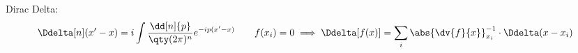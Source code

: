 Dirac Delta:
\begin{equation*}
        \Ddelta[n](x'-x) = i\int\frac{\dd[n]{p}}{\qty(2\pi)^n}e^{-ip(x'-x)}
        \qquad
        f(x_i) = 0
        \implies
        \Ddelta[f(x)] = \sum_{i} \abs{\dv{f}{x}}_{x_i}^{-1}\cdot\Ddelta(x-x_i)
\end{equation*}
